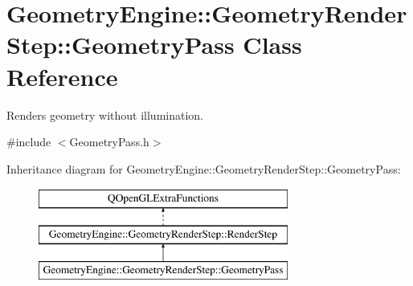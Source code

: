 \hypertarget{class_geometry_engine_1_1_geometry_render_step_1_1_geometry_pass}{}\section{Geometry\+Engine\+::Geometry\+Render\+Step\+::Geometry\+Pass Class Reference}
\label{class_geometry_engine_1_1_geometry_render_step_1_1_geometry_pass}


Renders geometry without illumination.  




{\ttfamily \#include $<$Geometry\+Pass.\+h$>$}

Inheritance diagram for Geometry\+Engine\+::Geometry\+Render\+Step\+::Geometry\+Pass\+:\begin{figure}[H]
\begin{center}
\leavevmode
\includegraphics[height=3.000000cm]{class_geometry_engine_1_1_geometry_render_step_1_1_geometry_pass}
\end{center}
\end{figure}
